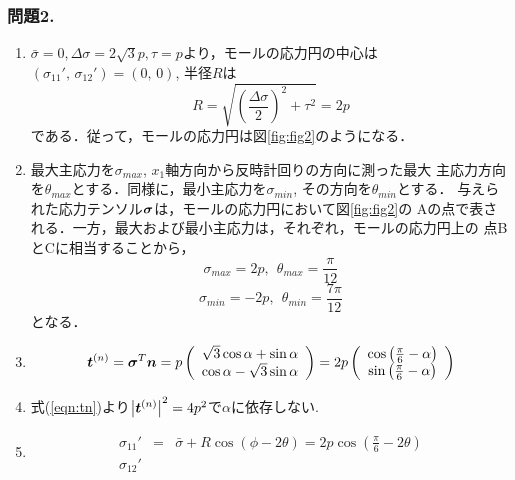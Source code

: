 \documentclass[10pt,a4j]{jarticle}
\begin{document}
\subsubsection*{問題2.}
\begin{enumerate}
\item
	$\bar{\sigma}=0, \Delta \sigma=2\sqrt{3}p, \tau = p$より，モールの応力円の中心は
	$(\sigma_{11}',\, \sigma_{12}')=(0,\, 0)$, 半径$R$は
	\begin{equation}
		R=\sqrt{\left(\frac{\Delta \sigma}{2}\right)^2+\tau ^2}=2p
		\label{neq:Radi}
	\end{equation}
	である．従って，モールの応力円は図\ref{fig:fig2}のようになる．
\item
	最大主応力を$\sigma_{max}$, $x_1$軸方向から反時計回りの方向に測った最大
	主応力方向を$\theta_{max}$とする．同様に，最小主応力を$\sigma_{min}$, 
	その方向を$\theta_{min}$とする．
	与えられた応力テンソル$\mbox{\boldmath $\sigma$}$は，モールの応力円において図\ref{fig:fig2}の
	Aの点で表される．一方，最大および最小主応力は，それぞれ，モールの応力円上の
	点BとCに相当することから，
	\begin{equation}
		\sigma_{max}=2p, \ \ \theta_{max}=\frac{\pi}{12}
	\end{equation}
	\begin{equation}
		\sigma_{min}=-2p, \ \ \theta_{min}=\frac{7\pi}{12}
	\end{equation}
	となる．
\item
	\begin{equation}
		\mbox{\boldmath $t$}^{(n)}
		=\mbox{\boldmath $\sigma$}^T\mbox{\boldmath $n$}
		=
		p
		\left( 
		\begin{array}{c}
			\sqrt{3} \cos\alpha +\sin\alpha \\
			\cos\alpha - \sqrt{3} \sin\alpha 
		\end{array}
		\right)
		=
		2p
		\left( 
		\begin{array}{c}
			\cos\left(\frac{\pi}{6}-\alpha\right) \\
			\sin\left(\frac{\pi}{6}-\alpha\right) 
		\end{array}
		\right)
		\label{eqn:tn}
	\end{equation}
\item
	式(\ref{eqn:tn})より$\left| \mbox{\boldmath $t$}^{(n)}\right|^2=4p^2$で$\alpha$に依存しない.
\item
	\begin{eqnarray}
		\sigma_{11}'
		&=&\bar \sigma +R \cos \left( \phi- 2\theta \right)
		= 2p \cos \left( \frac{\pi}{6}-2\theta\right) 
		\label{eqn:s11d}
		\\
		\sigma_{12}'

\end{eqnarray}
\end{enumerate}
\end{document}
